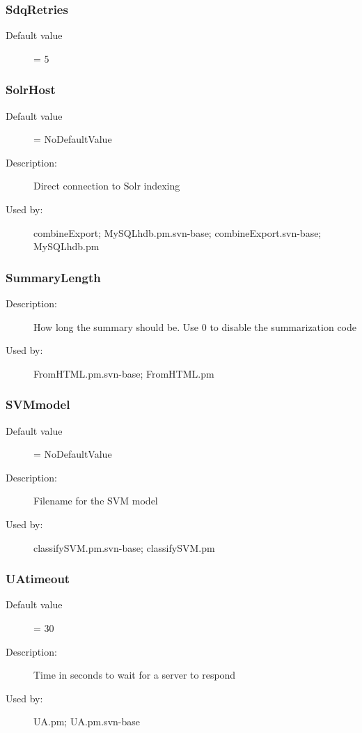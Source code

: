\subsubsection{SdqRetries}
\label{SdqRetries}
\begin{description}
\item[Default value] = 5
\end{description}
\subsubsection{SolrHost}
\label{SolrHost}
\begin{description}
\item[Default value] = NoDefaultValue
\item[Description:] Direct connection to Solr indexing
\item[Used by:] combineExport; MySQLhdb.pm.svn-base; combineExport.svn-base; MySQLhdb.pm
\end{description}
\subsubsection{SummaryLength}
\label{SummaryLength}
\begin{description}
\item[Description:] How long the summary should be. Use 0 to disable the summarization code
\item[Used by:] FromHTML.pm.svn-base; FromHTML.pm
\end{description}
\subsubsection{SVMmodel}
\label{SVMmodel}
\begin{description}
\item[Default value] = NoDefaultValue
\item[Description:] Filename for the SVM model
\item[Used by:] classifySVM.pm.svn-base; classifySVM.pm
\end{description}
\subsubsection{UAtimeout}
\label{UAtimeout}
\begin{description}
\item[Default value] = 30
\item[Description:] Time in seconds to wait for a server to respond
\item[Used by:] UA.pm; UA.pm.svn-base
\end{description}
